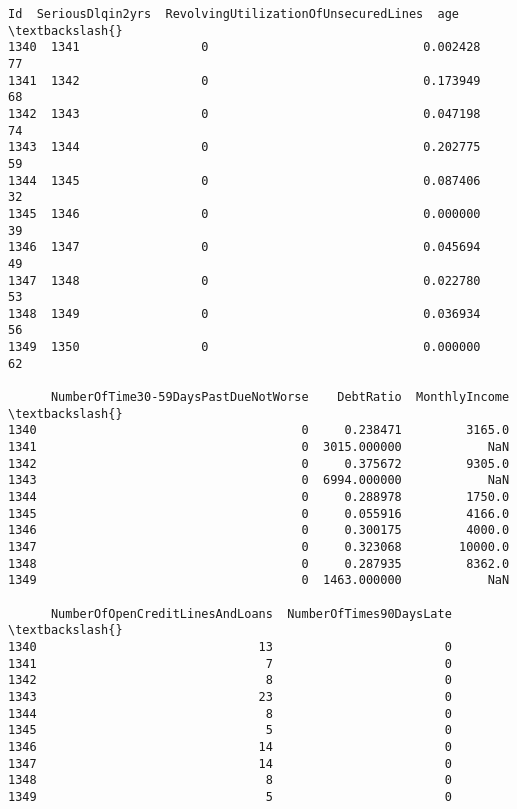 \documentclass[11pt]{article}
\makeatletter
\newcommand{\boxspacing}{\kern\kvtcb@left@rule\kern\kvtcb@boxsep}
\newcommand{\prompt}[4]{
        {\ttfamily\llap{{\color{#2}[#3]:\hspace{3pt}#4}}\vspace{-\baselineskip}}
    }
\makeatother
\begin{document}
            \begin{tcolorbox}[breakable, size=fbox, boxrule=.5pt, pad at break*=1mm, opacityfill=0]
\prompt{Out}{outcolor}{5}{\boxspacing}
\begin{Verbatim}[commandchars=\\\{\}]
        Id  SeriousDlqin2yrs  RevolvingUtilizationOfUnsecuredLines  age  \textbackslash{}
1340  1341                 0                              0.002428   77
1341  1342                 0                              0.173949   68
1342  1343                 0                              0.047198   74
1343  1344                 0                              0.202775   59
1344  1345                 0                              0.087406   32
1345  1346                 0                              0.000000   39
1346  1347                 0                              0.045694   49
1347  1348                 0                              0.022780   53
1348  1349                 0                              0.036934   56
1349  1350                 0                              0.000000   62

      NumberOfTime30-59DaysPastDueNotWorse    DebtRatio  MonthlyIncome  \textbackslash{}
1340                                     0     0.238471         3165.0
1341                                     0  3015.000000            NaN
1342                                     0     0.375672         9305.0
1343                                     0  6994.000000            NaN
1344                                     0     0.288978         1750.0
1345                                     0     0.055916         4166.0
1346                                     0     0.300175         4000.0
1347                                     0     0.323068        10000.0
1348                                     0     0.287935         8362.0
1349                                     0  1463.000000            NaN

      NumberOfOpenCreditLinesAndLoans  NumberOfTimes90DaysLate  \textbackslash{}
1340                               13                        0
1341                                7                        0
1342                                8                        0
1343                               23                        0
1344                                8                        0
1345                                5                        0
1346                               14                        0
1347                               14                        0
1348                                8                        0
1349                                5                        0


\end{Verbatim}
\end{tcolorbox}
\end{document}

